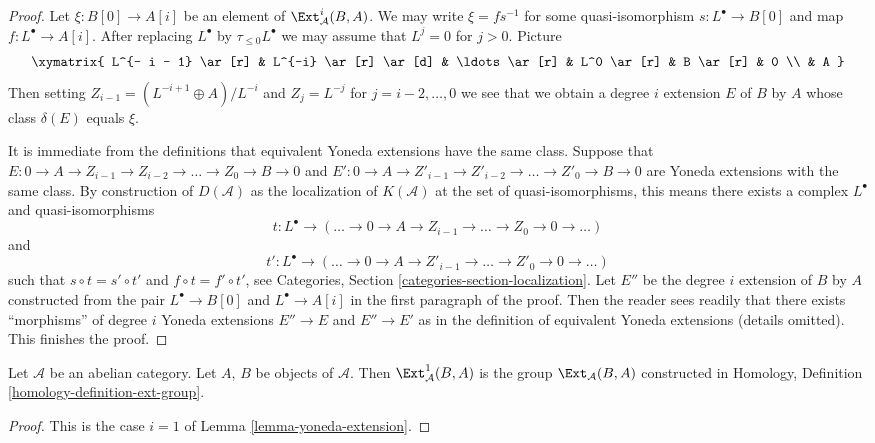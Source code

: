 \begin{proof}
Let $\xi : B[0] \to A[i]$ be an element of $\Ext^i_\mathcal{A}(B, A)$.
We may write $\xi = f s^{-1}$ for some quasi-isomorphism
$s : L^\bullet \to B[0]$ and map $f : L^\bullet \to A[i]$.
After replacing $L^\bullet$ by $\tau_{\leq 0}L^\bullet$ we may assume
that $L^j = 0$ for $j > 0$. Picture
$$
\xymatrix{
L^{- i - 1} \ar[r] & L^{-i} \ar[r] \ar[d] & \ldots \ar[r] &
L^0 \ar[r] & B \ar[r] & 0 \\
& A
}
$$
Then setting $Z_{i - 1} = (L^{- i + 1} \oplus A)/L^{-i}$ and
$Z_j = L^{-j}$ for $j = i - 2, \ldots, 0$ we see that we obtain a
degree $i$ extension $E$ of $B$ by $A$ whose class $\delta(E)$ equals
$\xi$.

\medskip\noindent
It is immediate from the definitions that equivalent Yoneda extensions
have the same class. Suppose that
$E : 0 \to A \to Z_{i - 1} \to Z_{i - 2} \to \ldots \to Z_0 \to B \to 0$ and
$E' : 0 \to A \to Z'_{i - 1} \to Z'_{i - 2} \to \ldots \to Z'_0 \to B \to 0$
are Yoneda extensions with the same class.
By construction of $D(\mathcal{A})$ as the localization
of $K(\mathcal{A})$ at the set of quasi-isomorphisms, this means there
exists a complex $L^\bullet$ and quasi-isomorphisms
$$
t : L^\bullet \to
(\ldots \to 0 \to A \to Z_{i - 1} \to \ldots \to Z_0 \to 0 \to \ldots)
$$
and
$$
t' : L^\bullet \to
(\ldots \to 0 \to A \to Z'_{i - 1} \to \ldots \to Z'_0 \to 0 \to \ldots)
$$
such that $s \circ t = s' \circ t'$ and $f \circ t = f' \circ t'$, see
Categories, Section \ref{categories-section-localization}.
Let $E''$ be the degree $i$ extension of $B$ by $A$ constructed from
the pair $L^\bullet \to B[0]$ and $L^\bullet \to A[i]$ in the first
paragraph of the proof. Then the reader sees readily that there exists
``morphisms'' of degree $i$ Yoneda extensions $E'' \to E$ and $E'' \to E'$
as in the definition of equivalent Yoneda extensions (details omitted).
This finishes the proof.
\end{proof}

\begin{lemma}
\label{lemma-ext-1}
Let $\mathcal{A}$ be an abelian category. Let $A$, $B$ be objects
of $\mathcal{A}$. Then $\Ext^1_\mathcal{A}(B, A)$ is
the group $\Ext_\mathcal{A}(B, A)$ constructed in
Homology, Definition \ref{homology-definition-ext-group}.
\end{lemma}

\begin{proof}
This is the case $i = 1$ of
Lemma \ref{lemma-yoneda-extension}.
\end{proof}

